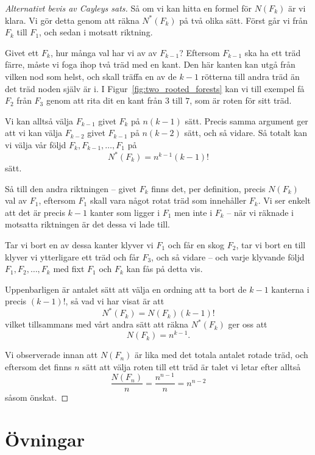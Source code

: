 \documentclass[nobib]{tufte-handout}
\begin{document}
\begin{proof}[Alternativt bevis av Cayleys sats]
    Så om vi kan hitta en formel för $N(F_k)$ är vi klara. Vi gör detta genom att räkna $N^*(F_k)$ på två olika sätt. Först går vi från $F_k$ till $F_1$, och sedan i motsatt riktning.

    Givet ett $F_k$, hur många val har vi av av $F_{k-1}$? Eftersom $F_{k-1}$ ska ha ett träd färre, måste vi foga ihop två träd med en kant. Den här kanten kan utgå från vilken nod som helst, och skall träffa en av de $k-1$ rötterna till andra träd än det träd noden själv är i. I Figur~\ref{fig:two_rooted_forests} kan vi till exempel få $F_2$ från $F_3$ genom att rita dit en kant från $3$ till $7$, som är roten för sitt träd.

    Vi kan alltså välja $F_{k-1}$ givet $F_k$ på $n(k-1)$ sätt. Precis samma argument ger att vi kan välja $F_{k-2}$ givet $F_{k-1}$ på $n(k-2)$ sätt, och så vidare. Så totalt kan vi välja vår följd $F_k, F_{k-1}, \ldots, F_1$ på
    $$N^*(F_k) = n^{k-1}(k-1)!$$
    sätt.

    Så till den andra riktningen -- givet $F_k$ finns det, per definition, precis $N(F_k)$ val av $F_1$, eftersom $F_1$ skall vara något rotat träd som innehåller $F_k$. Vi ser enkelt att det är precis $k-1$ kanter som ligger i $F_1$ men inte i $F_k$ -- när vi räknade i motsatta riktningen är det dessa vi lade till.

    Tar vi bort en av dessa kanter klyver vi $F_1$ och får en skog $F_2$, tar vi bort en till klyver vi ytterligare ett träd och får $F_3$, och så vidare -- och varje klyvande följd $F_1, F_2, \ldots, F_k$ med fixt $F_1$ och $F_k$ kan fås på detta vis.

    Uppenbarligen är antalet sätt att välja en ordning att ta bort de $k-1$ kanterna i precis $(k-1)!$, så vad vi har visat är att
    $$N^*(F_k) = N(F_k)(k-1)!$$
    vilket tillsammans med vårt andra sätt att räkna $N^*(F_k)$ ger oss att
    $$N(F_k) = n^{k-1}.$$

    Vi observerade innan att $N(F_n)$ är lika med det totala antalet rotade träd, och eftersom det finns $n$ sätt att välja roten till ett träd är talet vi letar efter alltså
    $$\frac{N(F_n)}{n} = \frac{n^{n-1}}{n} = n^{n-2}$$
    såsom önskat.
\end{proof}

\section{Övningar}
\end{document}
